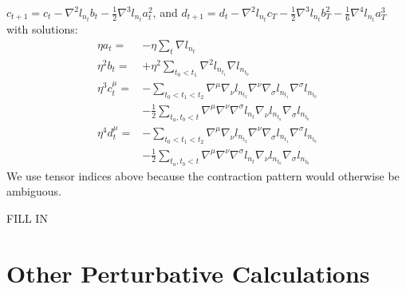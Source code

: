 \documentclass{article}
\theoremstyle{plain}
\theoremstyle{definition}
\begin{document}
            $
                c_{t+1} = c_t -\nabla^2 l_{n_t} b_t 
                              -\frac{1}{2} \nabla^3 l_{n_t} a_t^2
            $, and
            $
                d_{t+1} = d_t -             \nabla^2 l_{n_t} c_T
                              - \frac{1}{2} \nabla^3 l_{n_t} b_T^2 
                              - \frac{1}{6} \nabla^4 l_{n_t} a_T^3 
            $
            with solutions:
            \begin{align*}
                \eta a_t = &-\eta \sum_{t} \nabla l_{n_t}
                \\ 
                \eta^2 b_t = &+\eta^2 \sum_{t_0 < t_1} \nabla^2 l_{n_{t_1}} \nabla l_{n_{t_0}}
                \\
                \eta^3 c_t^\mu =
                    &-\sum_{t_0 < t_1 < t_2} 
                        \nabla^\mu \nabla_\nu l_{n_{t_2}}
                        \nabla^\nu \nabla_\sigma l_{n_{t_1}} \nabla^\sigma l_{n_{t_0}} \\
                    &-\frac{1}{2}
                        \sum_{t_a, t_b < t}
                        \nabla^\mu \nabla^\nu \nabla^\sigma l_{n_t}
                        \nabla_\nu l_{n_{t_a}}
                        \nabla_\sigma l_{n_{t_b}}
                \\
                \eta^4 d_t^\mu =
                    &-\sum_{t_0 < t_1 < t_2} 
                        \nabla^\mu \nabla_\nu l_{n_{t_2}}
                        \nabla^\nu \nabla_\sigma l_{n_{t_1}} \nabla^\sigma l_{n_{t_0}} \\
                    &-\frac{1}{2}
                        \sum_{t_a, t_b < t}
                        \nabla^\mu \nabla^\nu \nabla^\sigma l_{n_t}
                        \nabla_\nu l_{n_{t_a}}
                        \nabla_\sigma l_{n_{t_b}}
            \end{align*}
            We use tensor indices above because the contraction pattern would
            otherwise be ambiguous.

            {\color{moor} FILL IN}


\section{Other Perturbative Calculations} \label{sect:calculations}
\end{document}
